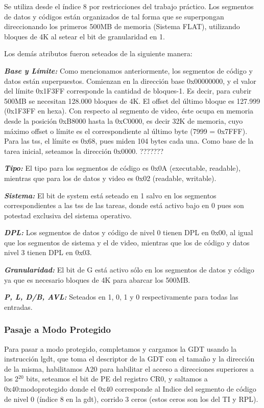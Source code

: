 \documentclass[a4paper]{article}
\begin{document}
\par Se utiliza desde el índice 8 por restricciones del trabajo práctico.
Los segmentos de datos y códigos están organizados de tal forma que se superpongan direccionando los primeros 500MB de memoria (Sistema FLAT), utilizando bloques de 4K al setear el bit de granularidad en 1.
\par Los demás atributos fueron seteados de la siguiente manera:
\par \textbf{\emph{Base y Límite: } }Como mencionamos anteriormente, los segmentos de código y datos están superpuestos. Comienzan en la dirección base 0x00000000, y el valor del límite 0x1F3FF corresponde la cantidad de bloques-1. Es decir, para cubrir 500MB se necesitan 128.000 bloques de 4K. El offset del último bloque es 127.999 (0x1F3FF en hexa).
Con respecto al segmento de video, éste ocupa en memoria desde la posición 0xB8000 hasta la 0xC0000, es decir 32K de memoria, cuyo máximo offset o límite es el correspondiente al último byte (7999 = 0x7FFF).
Para las tss, el límite es 0x68, pues miden 104 bytes cada una. Como base de la tarea inicial, seteamos la dirección 0x0000. ???????
\par \emph{\textbf{Tipo: }} El tipo para los segmentos de código es 0x0A (executable, readable), mientras que para los de datos y video es 0x02 (readable, writable).
\par \emph{\textbf{Sistema: }} El bit de system está seteado en 1 salvo en los segmentos correspondientes a las tss de las tareas, donde está activo bajo en 0 pues son potestad exclusiva del sistema operativo.
\par \emph{\textbf{DPL: }} Los segmentos de datos y código de nivel 0 tienen DPL en 0x00, al igual que los segmentos de sistema y el de video, mientras que los de código y datos nivel 3 tienen DPL en 0x03.
\par \emph{\textbf{Granularidad: }} El bit de G está activo sólo en los segmentos de datos y código ya que es necesario bloques de 4K para abarcar los 500MB.
\par \emph{\textbf{P, L, D/B, AVL: } }Seteados en 1, 0, 1 y 0 respectivamente para todas las entradas.
\newline

\subsubsection*{Pasaje a Modo Protegido}

\par Para pasar a modo protegido, completamos y cargamos la GDT usando la instrucción lgdt, que toma el descriptor de la GDT con el tamaño y la dirección de la misma, habilitamos A20 para habilitar el acceso a direcciones superiores a los 2$^{20}$ bits, seteamos el bit de PE del registro CR0, y saltamos a 0x40:modoprotegido donde el 0x40 corresponde al Indice del segmento de código de nivel 0 (índice 8 en la gdt), corrido 3 ceros (estos ceros son los del TI y RPL).
\end{document}
